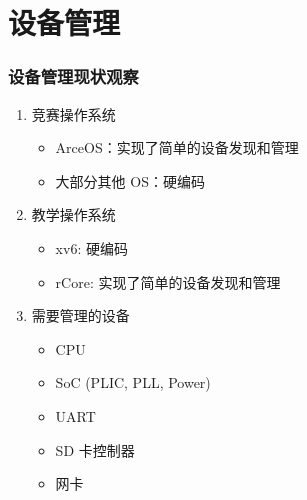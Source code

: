 \section{设备管理}

\begin{frame}
    \frametitle{设备管理现状观察}

    \begin{enumerate}
        \item 竞赛操作系统
              \begin{itemize}
                  \item ArceOS：实现了简单的设备发现和管理
                  \item 大部分其他 OS：硬编码
              \end{itemize}
        \item 教学操作系统
              \begin{itemize}
                  \item xv6: 硬编码
                  \item rCore: 实现了简单的设备发现和管理
              \end{itemize}
        \item 需要管理的设备
              \begin{itemize}
                  \item CPU
                  \item SoC (PLIC, PLL, Power)
                  \item UART
                  \item SD 卡控制器
                  \item 网卡
              \end{itemize}

    \end{enumerate}

\end{frame}


